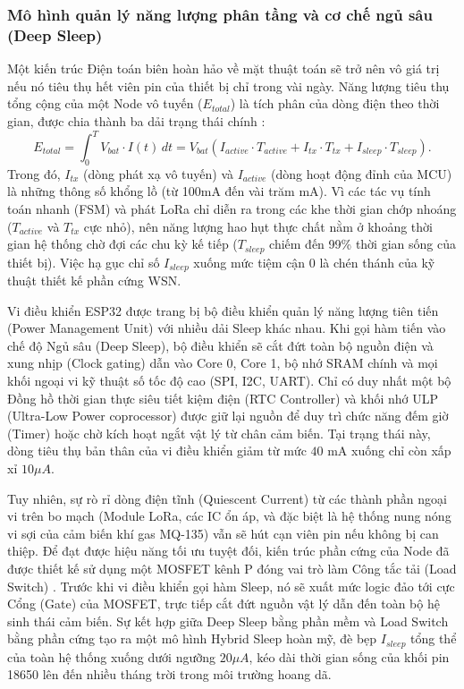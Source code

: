 \subsubsection{Mô hình quản lý năng lượng phân tầng và cơ chế ngủ sâu (Deep Sleep)}
Một kiến trúc Điện toán biên hoàn hảo về mặt thuật toán sẽ trở nên vô giá trị nếu nó tiêu thụ hết viên pin của thiết bị chỉ trong vài ngày. Năng lượng tiêu thụ tổng cộng của một Node vô tuyến ($E_{total}$) là tích phân của dòng điện theo thời gian, được chia thành ba dải trạng thái chính \cite{gomez2012overview}:
\begin{equation}
    {E_{total} = \int_{0}^{T} V_{bat} \cdot I(t) \, dt = V_{bat} \left( I_{active} \cdot T_{active} + I_{tx} \cdot T_{tx} + I_{sleep} \cdot T_{sleep} \right)}.
\end{equation}
Trong đó, $I_{tx}$ (dòng phát xạ vô tuyến) và $I_{active}$ (dòng hoạt động đỉnh của MCU) là những thông số khổng lồ (từ 100mA đến vài trăm mA). Vì các tác vụ tính toán nhanh (FSM) và phát LoRa chỉ diễn ra trong các khe thời gian chớp nhoáng ($T_{active}$ và $T_{tx}$ cực nhỏ), nên năng lượng hao hụt thực chất nằm ở khoảng thời gian hệ thống chờ đợi các chu kỳ kế tiếp ($T_{sleep}$ chiếm đến 99\% thời gian sống của thiết bị). Việc hạ gục chỉ số $I_{sleep}$ xuống mức tiệm cận 0 là chén thánh của kỹ thuật thiết kế phần cứng WSN.

Vi điều khiển ESP32 được trang bị bộ điều khiển quản lý năng lượng tiên tiến (Power Management Unit) với nhiều dải Sleep khác nhau. Khi gọi hàm tiến vào chế độ Ngủ sâu (Deep Sleep), bộ điều khiển sẽ cắt đứt toàn bộ nguồn điện và xung nhịp (Clock gating) dẫn vào Core 0, Core 1, bộ nhớ SRAM chính và mọi khối ngoại vi kỹ thuật số tốc độ cao (SPI, I2C, UART). Chỉ có duy nhất một bộ Đồng hồ thời gian thực siêu tiết kiệm điện (RTC Controller) và khối nhớ ULP (Ultra-Low Power coprocessor) được giữ lại nguồn để duy trì chức năng đếm giờ (Timer) hoặc chờ kích hoạt ngắt vật lý từ chân cảm biến. Tại trạng thái này, dòng tiêu thụ bản thân của vi điều khiển giảm từ mức $40 \text{ mA}$ xuống chỉ còn xấp xỉ $10 \mu A$.

Tuy nhiên, sự rò rỉ dòng điện tĩnh (Quiescent Current) từ các thành phần ngoại vi trên bo mạch (Module LoRa, các IC ổn áp, và đặc biệt là hệ thống nung nóng vi sợi của cảm biến khí gas MQ-135) vẫn sẽ hút cạn viên pin nếu không bị can thiệp. Để đạt được hiệu năng tối ưu tuyệt đối, kiến trúc phần cứng của Node đã được thiết kế sử dụng một MOSFET kênh P đóng vai trò làm Công tắc tải (Load Switch) \cite{instruments2016load}. Trước khi vi điều khiển gọi hàm Sleep, nó sẽ xuất mức logic đảo tới cực Cổng (Gate) của MOSFET, trực tiếp cắt đứt nguồn vật lý dẫn đến toàn bộ hệ sinh thái cảm biến. Sự kết hợp giữa Deep Sleep bằng phần mềm và Load Switch bằng phần cứng tạo ra một mô hình Hybrid Sleep hoàn mỹ, đè bẹp $I_{sleep}$ tổng thể của toàn hệ thống xuống dưới ngưỡng $20 \mu A$, kéo dài thời gian sống của khối pin 18650 lên đến nhiều tháng trời trong môi trường hoang dã.

